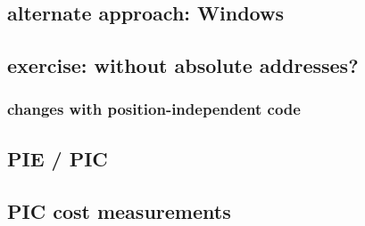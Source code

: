 \subsection{alternate approach: Windows}


\subsection{exercise: without absolute addresses?}


\subsubsection{changes with position-independent code}


\subsection{PIE / PIC}


\subsection{PIC cost measurements}

